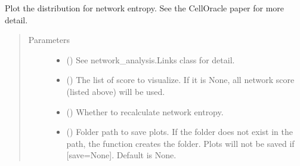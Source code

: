 \documentclass[letterpaper,10pt,english]{sphinxmanual}
\begin{document}
\begin{fulllineitems}
\begin{fulllineitems}
\begin{quote}
\begin{description}
\begin{itemize}
\end{itemize}

\end{description}\end{quote}

\end{fulllineitems}


\begin{fulllineitems}
\label{\detokenize{modules/celloracle:celloracle.Links.plot_network_entropy_distributions}}
Plot the distribution for network entropy.
See the CellOracle paper for more detail.
\begin{quote}\begin{description}
\item[{Parameters}] \leavevmode\begin{itemize}
\item {} 
 () \textendash{} See network\_analysis.Links class for detail.

\item {} 
 () \textendash{} The list of score to visualize. If it is None, all network score (listed above) will be used.

\item {} 
 () \textendash{} Whether to recalculate network entropy.

\item {} 
 () \textendash{} Folder path to save plots. If the folder does not exist in the path, the function creates the folder.
Plots will not be saved if {[}save=None{]}. Default is None.

\end{itemize}

\end{description}\end{quote}


\end{fulllineitems}
\end{fulllineitems}
\end{document}
